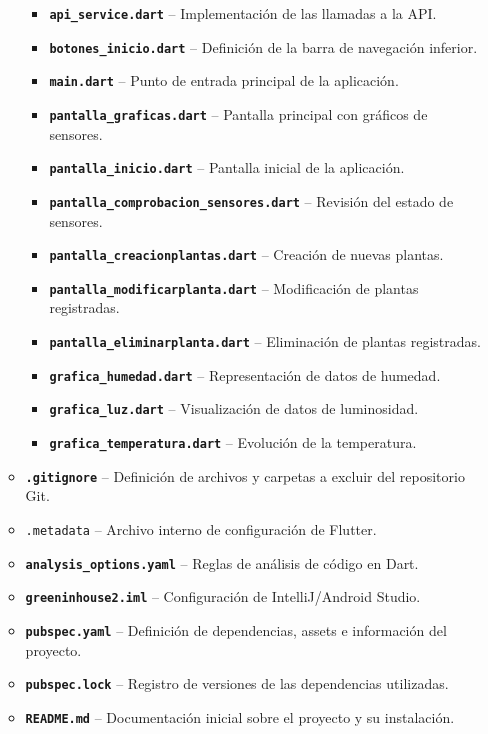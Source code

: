 \begin{itemize}
\begin{itemize}
\begin{itemize}
    \item \textbf{\texttt{api\_service.dart}} – Implementación de las llamadas a la API.
    \item \textbf{\texttt{botones\_inicio.dart}} – Definición de la barra de navegación inferior.
    \item \textbf{\texttt{main.dart}} – Punto de entrada principal de la aplicación.

    \item \texttt{\textbf{pantalla\_graficas.dart}} – Pantalla principal con gráficos de sensores.
    \item \texttt{\textbf{pantalla\_inicio.dart}} – Pantalla inicial de la aplicación.
    \item \texttt{\textbf{pantalla\_comprobacion\_sensores.dart}} – Revisión del estado de sensores.
    \item \texttt{\textbf{pantalla\_creacionplantas.dart}} – Creación de nuevas plantas.
    \item \texttt{\textbf{pantalla\_modificarplanta.dart}} – Modificación de plantas registradas.
    \item \texttt{\textbf{pantalla\_eliminarplanta.dart}} – Eliminación de plantas registradas.

    \item \texttt{\textbf{grafica\_humedad.dart}} – Representación de datos de humedad.
    \item \texttt{\textbf{grafica\_luz.dart}} – Visualización de datos de luminosidad.
    \item \texttt{\textbf{grafica\_temperatura.dart}} – Evolución de la temperatura.
    \end{itemize}

    \item \texttt{\textbf{.gitignore}} – Definición de archivos y carpetas a excluir del repositorio Git.
    \item \texttt{.metadata} – Archivo interno de configuración de Flutter.
    \item \texttt{\textbf{analysis\_options.yaml}} – Reglas de análisis de código en Dart.
    \item \texttt{\textbf{greeninhouse2.iml}} – Configuración de IntelliJ/Android Studio.
    \item \texttt{\textbf{pubspec.yaml}} – Definición de dependencias, assets e información del proyecto.
    \item \texttt{\textbf{pubspec.lock}} – Registro de versiones de las dependencias utilizadas.
    \item \texttt{\textbf{README.md}} – Documentación inicial sobre el proyecto y su instalación.
    \end{itemize}
\end{itemize}

